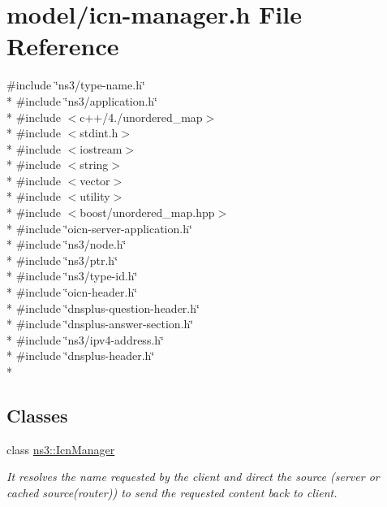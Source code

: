 \hypertarget{icn-manager_8h}{\section{model/icn-\/manager.h File Reference}
\label{icn-manager_8h}
}
{\ttfamily \#include \char`\"{}ns3/type-\/name.\-h\char`\"{}}\\*
{\ttfamily \#include \char`\"{}ns3/application.\-h\char`\"{}}\\*
{\ttfamily \#include $<$c++/4./unordered\-\_\-map$>$}\\*
{\ttfamily \#include $<$stdint.\-h$>$}\\*
{\ttfamily \#include $<$iostream$>$}\\*
{\ttfamily \#include $<$string$>$}\\*
{\ttfamily \#include $<$vector$>$}\\*
{\ttfamily \#include $<$utility$>$}\\*
{\ttfamily \#include $<$boost/unordered\-\_\-map.\-hpp$>$}\\*
{\ttfamily \#include \char`\"{}oicn-\/server-\/application.\-h\char`\"{}}\\*
{\ttfamily \#include \char`\"{}ns3/node.\-h\char`\"{}}\\*
{\ttfamily \#include \char`\"{}ns3/ptr.\-h\char`\"{}}\\*
{\ttfamily \#include \char`\"{}ns3/type-\/id.\-h\char`\"{}}\\*
{\ttfamily \#include \char`\"{}oicn-\/header.\-h\char`\"{}}\\*
{\ttfamily \#include \char`\"{}dnsplus-\/question-\/header.\-h\char`\"{}}\\*
{\ttfamily \#include \char`\"{}dnsplus-\/answer-\/section.\-h\char`\"{}}\\*
{\ttfamily \#include \char`\"{}ns3/ipv4-\/address.\-h\char`\"{}}\\*
{\ttfamily \#include \char`\"{}dnsplus-\/header.\-h\char`\"{}}\\*
\subsection*{Classes}
\begin{DoxyCompactItemize}
\item 
class \hyperlink{classns3_1_1IcnManager}{ns3\-::\-Icn\-Manager}
\begin{DoxyCompactList}\small\item\em It resolves the name requested by the client and direct the source (server or cached source(router)) to send the requested content back to client. \end{DoxyCompactList}\end{DoxyCompactItemize}
